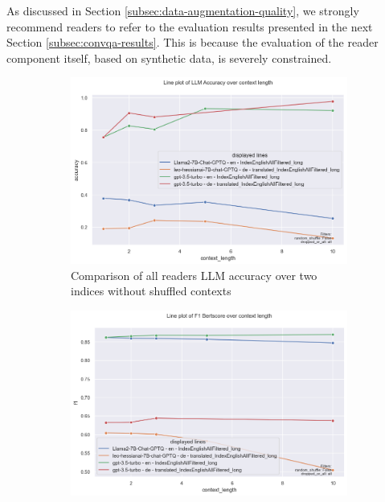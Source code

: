 As discussed in Section \ref{subsec:data-augmentation-quality}, we strongly recommend readers to refer to the evaluation results presented in the next Section \ref{subsec:convqa-results}. This is because the evaluation of the reader component itself, based on synthetic data, is severely constrained.


\begin{figure}
    \centering
    \begin{subfigure}{.5\textwidth}
        \centering
        \includegraphics[width=\linewidth]{Grafiken/Evaluation/Reader/all_models_filtered_indices.png}
        \captionsetup{width=.9\linewidth}
        \caption{Comparison of all readers LLM accuracy over two indices without shuffled contexts}
        \label{fig:reader-all-overview-performance}
    \end{subfigure}%
    \begin{subfigure}{.5\textwidth}
        \centering
        \includegraphics[width=\linewidth]{Grafiken/Evaluation/Reader/all_models_filtered_indices_f1.png}

\end{subfigure}
\end{figure}
